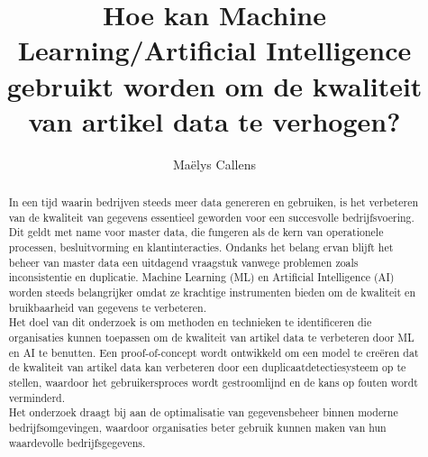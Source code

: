 \documentclass[a0,portrait]{hogent-poster}
\title{Hoe kan Machine Learning/Artificial Intelligence gebruikt worden om de kwaliteit van artikel data te verhogen?}
\author{Maëlys Callens}
\begin{document}
\maketitle

\begin{abstract}
In een tijd waarin bedrijven steeds meer data genereren en gebruiken, is het verbeteren van de kwaliteit van gegevens essentieel geworden voor een succesvolle bedrijfsvoering. Dit geldt met name voor master data, die fungeren als de kern van operationele processen, besluitvorming en klantinteracties. Ondanks het belang ervan blijft het beheer van master data een uitdagend vraagstuk vanwege problemen zoals inconsistentie en duplicatie. Machine Learning (ML) en Artificial Intelligence (AI) worden steeds belangrijker omdat ze krachtige instrumenten bieden om de kwaliteit en bruikbaarheid van gegevens te verbeteren.
  \\
Het doel van dit onderzoek is om methoden en technieken te identificeren die organisaties kunnen toepassen om de kwaliteit van artikel data te verbeteren door ML en AI te benutten. Een proof-of-concept wordt ontwikkeld om een model te creëren dat de kwaliteit van artikel data kan verbeteren door een duplicaatdetectiesysteem op te stellen, waardoor het gebruikersproces wordt gestroomlijnd en de kans op fouten wordt verminderd. 
  \\
Het onderzoek draagt bij aan de optimalisatie van gegevensbeheer binnen moderne bedrijfsomgevingen, waardoor organisaties beter gebruik kunnen maken van hun waardevolle bedrijfsgegevens.
\end{abstract}
\end{document}

